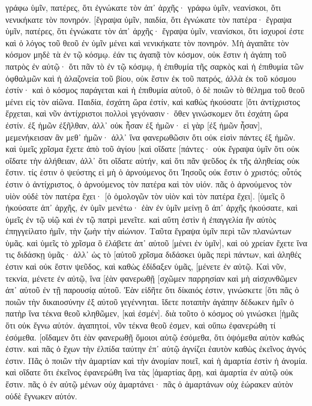 γράφω ὑμῖν, πατέρες, ὅτι ἐγνώκατε τὸν ἀπ᾽ ἀρχῆς· γράφω ὑμῖν, νεανίσκοι, ὅτι νενικήκατε τὸν πονηρόν. 
[ἔγραψα ὑμῖν, παιδία, ὅτι ἐγνώκατε τὸν πατέρα· ἔγραψα ὑμῖν, πατέρες, ὅτι ἐγνώκατε τὸν ἀπ᾽ ἀρχῆς· ἔγραψα ὑμῖν, νεανίσκοι, ὅτι ἰσχυροί ἐστε καὶ ὁ λόγος τοῦ θεοῦ ἐν ὑμῖν μένει καὶ νενικήκατε τὸν πονηρόν. 
Μὴ ἀγαπᾶτε τὸν κόσμον μηδὲ τὰ ἐν τῷ κόσμῳ. ἐάν τις ἀγαπᾷ τὸν κόσμον, οὐκ ἔστιν ἡ ἀγάπη τοῦ πατρὸς ἐν αὐτῷ· 
ὅτι πᾶν τὸ ἐν τῷ κόσμῳ, ἡ ἐπιθυμία τῆς σαρκὸς καὶ ἡ ἐπιθυμία τῶν ὀφθαλμῶν καὶ ἡ ἀλαζονεία τοῦ βίου, οὐκ ἔστιν ἐκ τοῦ πατρός, ἀλλὰ ἐκ τοῦ κόσμου ἐστίν· 
καὶ ὁ κόσμος παράγεται καὶ ἡ ἐπιθυμία αὐτοῦ, ὁ δὲ ποιῶν τὸ θέλημα τοῦ θεοῦ μένει εἰς τὸν αἰῶνα. 
Παιδία, ἐσχάτη ὥρα ἐστίν, καὶ καθὼς ἠκούσατε [ὅτι ἀντίχριστος ἔρχεται, καὶ νῦν ἀντίχριστοι πολλοὶ γεγόνασιν· ὅθεν γινώσκομεν ὅτι ἐσχάτη ὥρα ἐστίν. 
ἐξ ἡμῶν ἐξῆλθαν, ἀλλ᾽ οὐκ ἦσαν ἐξ ἡμῶν· εἰ γὰρ [ἐξ ἡμῶν ἦσαν], μεμενήκεισαν ἂν μεθ᾽ ἡμῶν· ἀλλ᾽ ἵνα φανερωθῶσιν ὅτι οὐκ εἰσὶν πάντες ἐξ ἡμῶν. 
καὶ ὑμεῖς χρῖσμα ἔχετε ἀπὸ τοῦ ἁγίου [καὶ οἴδατε [πάντες· 
οὐκ ἔγραψα ὑμῖν ὅτι οὐκ οἴδατε τὴν ἀλήθειαν, ἀλλ᾽ ὅτι οἴδατε αὐτήν, καὶ ὅτι πᾶν ψεῦδος ἐκ τῆς ἀληθείας οὐκ ἔστιν. 
τίς ἐστιν ὁ ψεύστης εἰ μὴ ὁ ἀρνούμενος ὅτι Ἰησοῦς οὐκ ἔστιν ὁ χριστός; οὗτός ἐστιν ὁ ἀντίχριστος, ὁ ἀρνούμενος τὸν πατέρα καὶ τὸν υἱόν. 
πᾶς ὁ ἀρνούμενος τὸν υἱὸν οὐδὲ τὸν πατέρα ἔχει· [ὁ ὁμολογῶν τὸν υἱὸν καὶ τὸν πατέρα ἔχει]. 
[ὑμεῖς ὃ ἠκούσατε ἀπ᾽ ἀρχῆς, ἐν ὑμῖν μενέτω· ἐὰν ἐν ὑμῖν μείνῃ ὃ ἀπ᾽ ἀρχῆς ἠκούσατε, καὶ ὑμεῖς ἐν τῷ υἱῷ καὶ ἐν τῷ πατρὶ μενεῖτε. 
καὶ αὕτη ἐστὶν ἡ ἐπαγγελία ἣν αὐτὸς ἐπηγγείλατο ἡμῖν, τὴν ζωὴν τὴν αἰώνιον. 
Ταῦτα ἔγραψα ὑμῖν περὶ τῶν πλανώντων ὑμᾶς. 
καὶ ὑμεῖς τὸ χρῖσμα ὃ ἐλάβετε ἀπ᾽ αὐτοῦ [μένει ἐν ὑμῖν], καὶ οὐ χρείαν ἔχετε ἵνα τις διδάσκῃ ὑμᾶς· ἀλλ᾽ ὡς τὸ [αὐτοῦ χρῖσμα διδάσκει ὑμᾶς περὶ πάντων, καὶ ἀληθές ἐστιν καὶ οὐκ ἔστιν ψεῦδος, καὶ καθὼς ἐδίδαξεν ὑμᾶς, [μένετε ἐν αὐτῷ. 
Καὶ νῦν, τεκνία, μένετε ἐν αὐτῷ, ἵνα [ἐὰν φανερωθῇ [σχῶμεν παρρησίαν καὶ μὴ αἰσχυνθῶμεν ἀπ᾽ αὐτοῦ ἐν τῇ παρουσίᾳ αὐτοῦ. 
Ἐὰν εἰδῆτε ὅτι δίκαιός ἐστιν, γινώσκετε [ὅτι πᾶς ὁ ποιῶν τὴν δικαιοσύνην ἐξ αὐτοῦ γεγέννηται. 
ἴδετε ποταπὴν ἀγάπην δέδωκεν ἡμῖν ὁ πατὴρ ἵνα τέκνα θεοῦ κληθῶμεν, [καὶ ἐσμέν]. διὰ τοῦτο ὁ κόσμος οὐ γινώσκει [ἡμᾶς ὅτι οὐκ ἔγνω αὐτόν. 
ἀγαπητοί, νῦν τέκνα θεοῦ ἐσμεν, καὶ οὔπω ἐφανερώθη τί ἐσόμεθα. [οἴδαμεν ὅτι ἐὰν φανερωθῇ ὅμοιοι αὐτῷ ἐσόμεθα, ὅτι ὀψόμεθα αὐτὸν καθώς ἐστιν. 
καὶ πᾶς ὁ ἔχων τὴν ἐλπίδα ταύτην ἐπ᾽ αὐτῷ ἁγνίζει ἑαυτὸν καθὼς ἐκεῖνος ἁγνός ἐστιν. 
Πᾶς ὁ ποιῶν τὴν ἁμαρτίαν καὶ τὴν ἀνομίαν ποιεῖ, καὶ ἡ ἁμαρτία ἐστὶν ἡ ἀνομία. 
καὶ οἴδατε ὅτι ἐκεῖνος ἐφανερώθη ἵνα τὰς [ἁμαρτίας ἄρῃ, καὶ ἁμαρτία ἐν αὐτῷ οὐκ ἔστιν. 
πᾶς ὁ ἐν αὐτῷ μένων οὐχ ἁμαρτάνει· πᾶς ὁ ἁμαρτάνων οὐχ ἑώρακεν αὐτὸν οὐδὲ ἔγνωκεν αὐτόν. 
